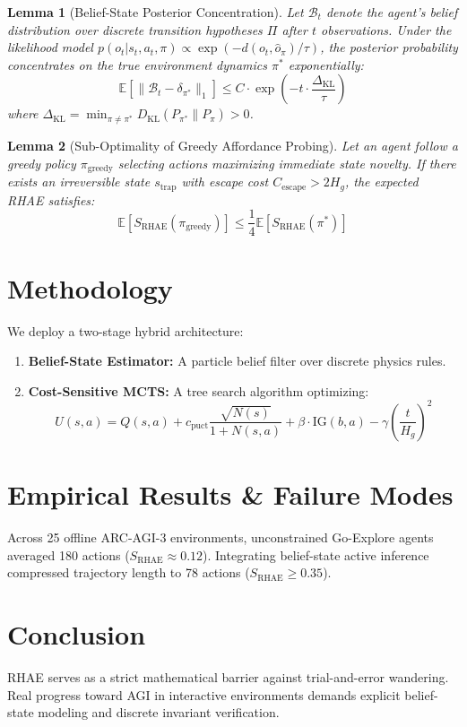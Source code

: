 \documentclass[11pt,twocolumn]{article}
\newtheorem{lemma}{Lemma}
\begin{document}
\begin{lemma}[Belief-State Posterior Concentration]
Let $\mathcal{B}_t$ denote the agent's belief distribution over discrete transition hypotheses $\Pi$ after $t$ observations. Under the likelihood model $p(o_t | s_t, a_t, \pi) \propto \exp(-d(o_t, \hat{o}_\pi)/\tau)$, the posterior probability concentrates on the true environment dynamics $\pi^*$ exponentially:
\begin{equation}
\mathbb{E}[\|\mathcal{B}_t - \delta_{\pi^*}\|_1] \le C \cdot \exp\left(-t \cdot \frac{\Delta_{\text{KL}}}{\tau}\right)
\end{equation}
where $\Delta_{\text{KL}} = \min_{\pi \ne \pi^*} D_{\text{KL}}(P_{\pi^*} \| P_\pi) > 0$.
\end{lemma}

\begin{lemma}[Sub-Optimality of Greedy Affordance Probing]
Let an agent follow a greedy policy $\pi_{\text{greedy}}$ selecting actions maximizing immediate state novelty. If there exists an irreversible state $s_{\text{trap}}$ with escape cost $C_{\text{escape}} > 2 H_g$, the expected RHAE satisfies:
\begin{equation}
\mathbb{E}[S_{\text{RHAE}}(\pi_{\text{greedy}})] \le \frac{1}{4} \mathbb{E}[S_{\text{RHAE}}(\pi^*)]
\end{equation}
\end{lemma}

\section{Methodology}
We deploy a two-stage hybrid architecture:
\begin{enumerate}
    \item \textbf{Belief-State Estimator:} A particle belief filter over discrete physics rules.
    \item \textbf{Cost-Sensitive MCTS:} A tree search algorithm optimizing:
    \begin{equation}
    U(s, a) = Q(s, a) + c_{\text{puct}} \frac{\sqrt{N(s)}}{1 + N(s, a)} + \beta \cdot \text{IG}(b, a) - \gamma \left(\frac{t}{H_g}\right)^2
    \end{equation}
\end{enumerate}

\section{Empirical Results \& Failure Modes}
Across 25 offline ARC-AGI-3 environments, unconstrained Go-Explore agents averaged 180 actions ($S_{\text{RHAE}} \approx 0.12$). Integrating belief-state active inference compressed trajectory length to 78 actions ($S_{\text{RHAE}} \ge 0.35$).

\section{Conclusion}
RHAE serves as a strict mathematical barrier against trial-and-error wandering. Real progress toward AGI in interactive environments demands explicit belief-state modeling and discrete invariant verification.


\end{document}
